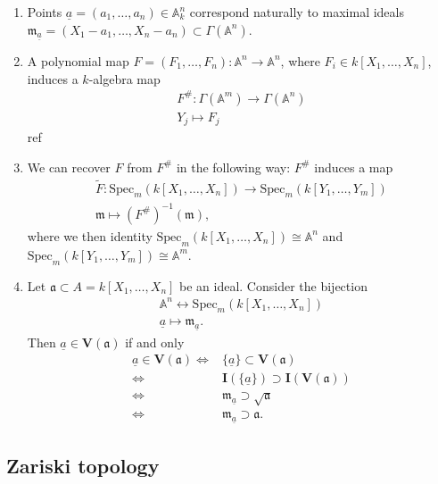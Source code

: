 \documentclass[12pt]{article}
\begin{document}
\begin{enumerate}
	\item Points $\underline{a}=(a_1,\dots,a_n)\in\mathbb{A}_k^n$ correspond naturally to maximal ideals $\mathfrak{m}_{\underline{a}}=(X_1-a_1,\dots,X_n-a_n)\subset\Gamma(\mathbb{A}^n)$.
	\item A polynomial map $F=(F_1,\dots,F_n):\mathbb{A}^n\to\mathbb{A}^n$, where $F_i\in k[X_1,\dots,X_n]$, induces a $k$-algebra map 
		\begin{gather*}
			F^\#:\Gamma(\mathbb{A}^m)\to\Gamma(\mathbb{A}^n) \\
			Y_j \mapsto F_j 
		\end{gather*}
		ref 
	\item We can recover $F$ from $F^\#$ in the following way: $F^\#$ induces a map 
		\begin{gather*}
			\tilde{F}: \text{Spec}_m(k[X_1,\dots,X_n]) \to \text{Spec}_m(k[Y_1,\dots,Y_m]) \\
			\mathfrak{m} \mapsto (F^\#)^{-1}(\mathfrak{m}),
		\end{gather*}
		where we then identity $\text{Spec}_m(k[X_1,\dots,X_n])\cong \mathbb{A}^n$ and $\text{Spec}_m(k[Y_1,\dots,Y_m])\cong\mathbb{A}^m$.
	\item Let $\mathfrak{a}\subset A=k[X_1,\dots,X_n]$ be an ideal. Consider the bijection 
		\begin{gather*}
			\mathbb{A}^n\leftrightarrow \text{Spec}_m(k[X_1,\dots,X_n]) \\
			\underline{a} \mapsto \mathfrak{m}_{\underline{a}}.
		\end{gather*}
		Then $\underline{a}\in\mathbf{V}(\mathfrak{a})$ if and only 
		\begin{align*}
			\underline{a}\in\mathbf{V}(\mathfrak{a})
			\Leftrightarrow& \{\underline{a}\}\subset \mathbf{V}(\mathfrak{a}) \\
			\Leftrightarrow& \mathbf{I}(\{\underline{a}\})\supset\mathbf{I}(\mathbf{V}(\mathfrak{a})) \\
			\Leftrightarrow& \mathfrak{m}_{\underline{a}}\supset\sqrt{\mathfrak{a}} \\
			\Leftrightarrow& \mathfrak{m}_{\underline{a}}\supset\mathfrak{a}.
		\end{align*}
\end{enumerate}


\subsection{Zariski topology} %
\end{document}
